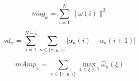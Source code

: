 \begin{equation}
mag_{\omega} = \sum_{i=1}^{N} \|\omega(i)\|^{2}
\end{equation}

\begin{equation}
sd_{\alpha} = \sum_{i=1}^{N-1}\sum_{\kappa \in \{x,y,z\}} |\alpha_{\kappa}(i) - \alpha_{\kappa}(i+1)|
\end{equation}

\begin{equation}
mAmp_{\omega} = \sum_{\kappa \in \{x,y,z\}} \max_{4 \leq \xi \leq 7} \hat{\omega}_{\kappa}(\xi)
\end{equation}




